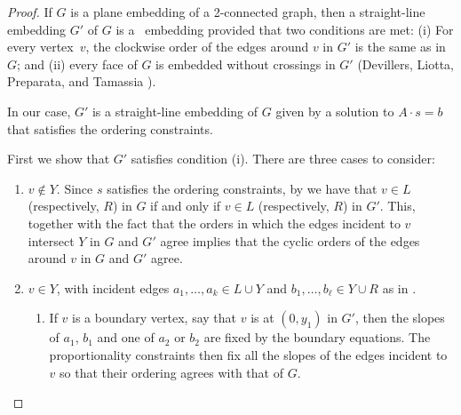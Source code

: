 \begin{proof}
	If $G$ is a plane embedding of a 2-connected graph, then a
	straight-line embedding $G'$ of $G$ is a \Fary\ embedding provided
	that two conditions are met:
	(i) For every vertex~$v$, the clockwise order of the
	edges around $v$ in $G'$ is the same as in $G$; and
	(ii) every face of $G$ is embedded without crossings in $G'$
	(Devillers, Liotta, Preparata, and Tamassia \cite[Lemma~16]{devillers.liotta.ea:checking}).
	
	In our case, $G'$ is a straight-line embedding of $G$ given by a solution
	to $A\cdot s = b$ that satisfies the ordering constraints.  
	
	
	First we show that $G'$ satisfies condition (i). There are three cases to consider:
	\begin{enumerate}
		\item $v\not\in Y$. Since $s$ satisfies the ordering constraints, by  we have that $v\in L$ (respectively, $R$) in $G$ if and only if $v\in L$ (respectively, $R$) in $G'$. This, together with the fact that the orders in which the edges incident to $v$ intersect $Y$ in $G$ and $G'$ agree implies that the cyclic orders of the edges around $v$ in $G$ and $G'$ agree.
		
		\item
		$v\in Y$, with incident edges $a_1,\ldots,a_k\in
		L\cup Y$ and $b_1,\ldots,b_\ell\in Y\cup R$ as in . 
		\begin{enumerate}
			\item If $v$ is a boundary vertex, say that $v$ is at $(0,y_1)$ in $G'$, then the slopes of $a_1$, $b_1$ and one of $a_2$ or $b_2$ are fixed by the boundary equations.  The proportionality
			constraints then fix all the slopes of the edges incident to $v$ so that
			their ordering agrees with that of $G$.
			

\end{enumerate}
\end{enumerate}
\end{proof}
